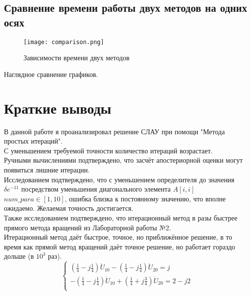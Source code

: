 \documentclass[12pt]{article}
\begin{document}
\subsection{Сравнение времени работы двух методов на одних осях}
\begin{figure}[h!]
\texttt{[image: comparison.png]}
\caption{Зависимости времени двух методов}
\label{error_errorData}
\end{figure}
Наглядное сравнение графиков.
\pagebreak
\newpage
\section{Краткие выводы}
В данной работе я проанализировал решение СЛАУ при помощи "Метода простых итераций".\\ 
С уменьшением требуемой точности количество итераций возрастает.\\
Ручными вычислениями подтверждено, что засчёт апостериорной оценки могут появиться лишние итерации.\\
Исследованием подтверждено, что с уменьшением определителя до значения $\delta e^{-11}$ посредством уменьшения диагонального элемента $A[i,i]$ $num\_para \in [1,10]$, ошибка близка к постоянному значению, что вполне ожидаемо. Желаемая точность достигается.\\ 
Также исследованием подтверждено, что итерационный метод в разы быстрее прямого метода вращений из Лабораторной работы №2.\\
Итерационный метод даёт быстрое, точное, но приближённое решение, в то время как прямой метод вращений даёт точное решение, но работает гораздо дольше (в $10^{3}$ раз).\\


\begin{equation}
   \begin{cases}
   (\frac{1}{4}-j\frac{1}{4})\dot{U}_{10}- (\frac{1}{4}-j\frac{1}{4})\dot{U}_{20} =j\\
   -(\frac{1}{4}-j\frac{1}{4})\dot{U}_{10}+(\frac{1}{4}+j\frac{3}{4})\dot{U}_{20} = 2-j2\\
   \end{cases}
    
\end{equation}
\end{document}
